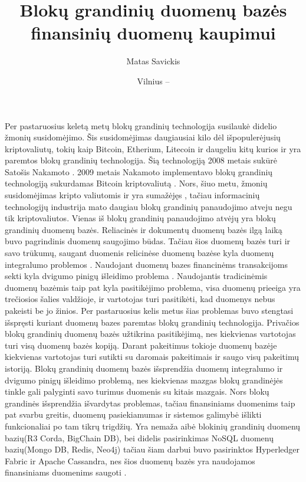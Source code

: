 \documentclass{VUMIFPSkursinis}
\title{Blokų grandinių duomenų bazės finansinių duomenų kaupimui}
\author{Matas Savickis}
\date{Vilnius – \the\year}
\begin{document}
\maketitle

\tableofcontents

Per pastaruosius keletą metų blokų grandinių technologija susilaukė didelio žmonių susidomėjimo. 
Šis susidomėjimas daugiausiai kilo dėl išpopulerėjusių kriptovaliutų, tokių kaip Bitcoin, Etherium, Litecoin ir daugeliu kitų 
kurios ir yra paremtos blokų grandinių technologija. Šią technologiją 2008 metais sukūrė Satošis Nakamoto  \cite{BlockChain}. 
2009 metais Nakamoto implementavo blokų grandinių technologiją sukurdamas Bitcoin kriptovaliutą \cite{Bitcoin}. 
Nors, šiuo metu, žmonių susidomėjimas kripto valiutomis ir yra sumažėjęs \cite{Trends}, tačiau informacinių technologijų industrija 
mato daugiau blokų grandinių panaudojimo atveju negu tik kriptovaliutos. Vienas iš blokų grandinių panaudojimo atvėjų yra 
blokų grandinių duomenų bazės. Reliacinės ir dokumentų duomenų bazės ilgą laiką buvo pagrindinis duomenų saugojimo būdas. 
Tačiau šios duomenų bazės turi ir savo trūkumų, saugant duomenis relicinėse duomenų bazėse kyla duomenų integralumo problemos \cite{Integrity}
. 
Naudojant duomenų bazes financinėms transakcijoms sekti kyla dvigumo pinigų išleidimo problema\cite{Double}
. Naudojantis tradicinėmis duomenų bazėmis 
taip pat kyla pasitikėjimo problema, visa duomenų prieeiga yra trečiosios šalies valdžioje, ir vartotojas turi pasitikėti, kad duomenys nebus pakeisti be jo žinios.
Per pastaruosius kelis metus šias problemas
 buvo stengtasi išspręsti kuriant duomenų bazes paremtas blokų grandinių technologija. Privačios blokų grandinių duomenų bazės užtikrina pasitikėjimą, nes kiekvienas vartotojas turi visą duomenų 
bazės kopiją. Darant pakeitimus tokioje duomenų bazėje kiekvienas vartotojas turi sutikti su daromais pakeitimais ir saugo visų pakeitimų istoriją. Blokų grandinių duomenų bazės išsprendžia duomenų integralumo ir
dvigumo pinigų išleidimo problemą, nes kiekvienas mazgas blokų grandinėjės tinkle gali palyginti savo turimus duomenis su kitais mazgais. 
Nors blokų grandinės išsprendžia išvardytas problemas, tačiau finansiniams duomenims taip pat svarbu greitis, duomenų pasiekiamumas ir sistemos galimybė išlikti funkcionaliai po tam tikrų trigdžių. 
Yra nemaža aibė blokinių grandinių duomenų bazių(R3 Corda, BigChain DB), bei didelis pasirinkimas NoSQL duomenų bazių(Mongo DB, Redis, Neo4j) tačiau šiam darbui buvo pasirinktos
Hyperledger Fabric ir Apache Cassandra, nes šios duomenų bazės yra naudojamos finansiniams duomenims saugoti \cite{BnkH} \cite{BnkC}.
\end{document}
